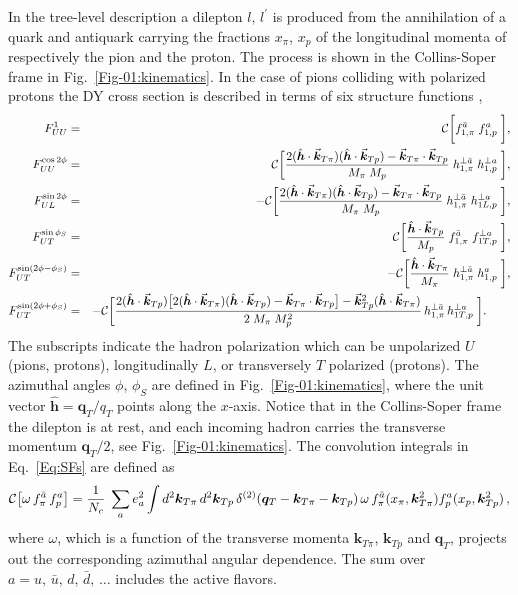 \documentclass[a4paper]{article}
\newcommand{\be}{\begin{equation}}
\newcommand{\ee}{\end{equation}}
\newcommand{\ba}{\begin{eqnarray}}
\newcommand{\ea}{\end{eqnarray}}
\def\qT{\bm q_T}
\def\vkTpi{\vec{\bm k}_{T\pi}}
\def\vkTN{\vec{\bm k}_{Tp}}
\def\kTpi{{\bm k}_{T \pi}}
\def\kTN{{\bm k}_{Tp}}
\def\hhat{\hat{\bm h}}
\begin{document}
In the tree-level description a dilepton $l,\,l^\prime$ is produced from
the annihilation of a quark and antiquark carrying the fractions $x_\pi$, 
$x_p$ of the longitudinal momenta of respectively the pion and the proton. 
The process is shown in the Collins-Soper frame in Fig.~\ref{Fig-01:kinematics}.
In the case of pions colliding with polarized protons the DY cross 
section is described in terms of six structure functions \cite{Arnold:2008kf},  
\ba
   F_{UU}^1 &=& \phantom{-}
   {\cal C}  \bigg[f_{1,\pi}^{\bar a} \; f_{1,p}^{a}\;\bigg], \nonumber \\
   F_{UU}^{\cos 2\phi} &=& \phantom{-}
   {\cal C} \bigg[ \frac{2(\hhat \cdot \vkTpi)(\hhat \cdot \vkTN) 
       - \vkTpi \cdot \vkTN}{M_\pi \; M_p} \; 
     h_{1,\pi}^{\perp \bar a} \; h_{1,p}^{\perp a} \; \bigg],  \nonumber \\
   F_{UL}^{\sin 2\phi} &=& 
   -  {\cal C} \bigg[ \frac{2(\hhat \cdot \vkTpi)(\hhat \cdot \vkTN) 
       - \vkTpi \cdot \vkTN}{M_\pi \; M_p} \; 
     h_{1,\pi}^{\perp\bar a}\; h_{1L, p}^{\perp a} \; \bigg],  \nonumber \\
   F_{UT}^{\sin \phi_S} &=& \phantom{-}
   {\cal C} \bigg[ \frac{\hhat \cdot \vkTN}{M_p} \; 
     f_{1,\pi}^{\bar a} \; f_{1T, p}^{\perp a} \; \bigg],  \nonumber \\
   F_{UT}^{\sin (2\phi - \phi_S)} &=& 
   -  {\cal C}  \bigg[ \frac{\hhat \cdot \vkTpi}{M_\pi} \; 
     h_{1,\pi}^{\perp\bar a} \;h_{1, p}^{a} \; \bigg],  \nonumber\\
   F_{UT}^{\sin (2\phi + \phi_S)} &=& 
   -  {\cal C}  \bigg[ \frac{2(\hhat \cdot \vkTN) 
       \big[2(\hhat \cdot \vkTpi)(\hhat \cdot \vkTN) 
       - \vkTpi \cdot \vkTN \big] 
       - \vkTN^2(\hhat \cdot \vkTpi)}{2 \; M_\pi \; M_p^2} \,
     h_{1, \pi}^{\perp\bar a}\, h_{1T, p}^{\perp a} \; \bigg]. \quad \quad \label{Eq:SFs} 
\ea
The subscripts indicate the hadron polarization which can be unpolarized $U$ 
(pions, protons), longitudinally $L$, or transversely $T$ polarized (protons). 
The azimuthal angles $\phi$, $\phi_S$ are defined in
Fig.~\ref{Fig-01:kinematics}, where the unit vector 
$\hhat=\qT/q_T$ points along the $x$-axis. Notice that in 
the Collins-Soper frame the dilepton is at rest, and 
each incoming hadron carries the transverse momentum 
$\qT/2$, see Fig.~\ref{Fig-01:kinematics}.
The convolution integrals in Eq.~\eqref{Eq:SFs}
are defined  as~\cite{Arnold:2008kf} 
\be
 \label{Eq:convolution-integral} 
    {\cal C}\bigl[\omega \, f_{\pi}^{\bar a} \, f_p^{a}\bigr] = \frac{1}{N_c} \; 
    \sum_a e_a^2\int d^2\kTpi \, d^2\kTN \, \delta^{(2)}(\qT- \kTpi-\kTN) \,
    \omega \, f_{\pi}^{\bar a}(x_\pi,\kTpi^2)f_p^{a}(x_p,\kTN^2)\,,
\ee  
where $\omega$, which is a function of the transverse momenta $\kTpi$, $\kTN$
and $\qT$, projects out the corresponding azimuthal angular dependence.
The sum over $a=u,\,\bar{u},\,d,\,\bar{d},\,\dots$ includes the active flavors. 
\end{document}
